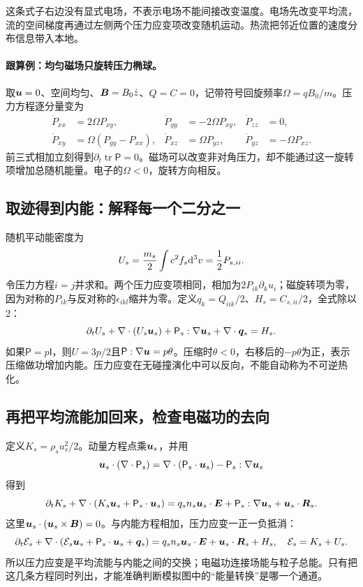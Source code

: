 \documentclass[UTF8,a4paper,11pt,openany,fontset=fandol]{ctexbook}
\begin{document}
这条式子右边没有显式电场，不表示电场不能间接改变温度。电场先改变平均流，流的空间梯度再通过左侧两个压力应变项改变随机运动。热流把邻近位置的速度分布信息带入本地。

\paragraph{跟算例：均匀磁场只旋转压力椭球。}
取$\bm{u}=0$、空间均匀、$\bm{B}=B_0\hat z$、$Q=C=0$，记带符号回旋频率$\Omega=qB_0/m$。压力方程逐分量变为
\begin{align}
 \dot P_{xx}&=2\Omega P_{xy},&
 \dot P_{yy}&=-2\Omega P_{xy},&
 \dot P_{zz}&=0,\\
 \dot P_{xy}&=\Omega(P_{yy}-P_{xx}),&
 \dot P_{xz}&=\Omega P_{yz},&
 \dot P_{yz}&=-\Omega P_{xz}.
\end{align}
前三式相加立刻得到$\partial_t\operatorname{tr}\mathsf P=0$。磁场可以改变非对角压力，却不能通过这一旋转项增加总随机能量。电子的$\Omega<0$，旋转方向相反。

\subsection{取迹得到内能：解释每一个二分之一}
随机平动能密度为
\begin{equation}
 U_s={m_s\over2}\int c^2f_s\mathrm d^3v={1\over2}P_{s,ii}.
\end{equation}
令压力方程$i=j$并求和。两个压力应变项相同，相加为$2P_{ik}\partial_ku_i$；磁旋转项为零，因为对称的$P_{ik}$与反对称的$\epsilon_{ikl}$缩并为零。定义$q_k=Q_{iik}/2$、$H_s=C_{s,ii}/2$，全式除以2：
\begin{equation}
 \partial_tU_s+\nabla\cdot(U_s\bm{u}_s)
 +\mathsf P_s:\nabla\bm{u}_s+\nabla\cdot\bm{q}_s=H_s.
 \label{eq:internal}
\end{equation}
如果$\mathsf P=p\mathsf I$，则$U=3p/2$且$\mathsf P:\nabla\bm{u}=p\theta$。压缩时$\theta<0$，右移后的$-p\theta$为正，表示压缩做功增加内能。压力应变在无碰撞演化中可以反向，不能自动称为不可逆热化。

\subsection{再把平均流能加回来，检查电磁功的去向}
定义$K_s=\rho_su_s^2/2$。动量方程点乘$\bm{u}_s$，并用
\begin{equation}
 \bm{u}_s\cdot(\nabla\cdot\mathsf P_s)
 =\nabla\cdot(\mathsf P_s\cdot\bm{u}_s)-\mathsf P_s:\nabla\bm{u}_s
\end{equation}
得到
\begin{equation}
 \partial_tK_s+\nabla\cdot(K_s\bm{u}_s+\mathsf P_s\cdot\bm{u}_s)
 =q_sn_s\bm{u}_s\cdot\bm{E}+\mathsf P_s:\nabla\bm{u}_s+\bm{u}_s\cdot\bm{R}_s.
\end{equation}
这里$\bm{u}_s\cdot(\bm{u}_s\times\bm{B})=0$。与内能方程相加，压力应变一正一负抵消：
\begin{equation}
 \partial_t\mathcal E_s+
 \nabla\cdot(\mathcal E_s\bm{u}_s+\mathsf P_s\cdot\bm{u}_s+\bm{q}_s)
 =q_sn_s\bm{u}_s\cdot\bm{E}+\bm{u}_s\cdot\bm{R}_s+H_s,
 \quad\mathcal E_s=K_s+U_s.
 \label{eq:energy}
\end{equation}
所以压力应变是平均流能与内能之间的交换；电磁功连接场能与粒子总能。只有把这几条方程同时列出，才能准确判断模拟图中的“能量转换”是哪一个通道。
\end{document}
